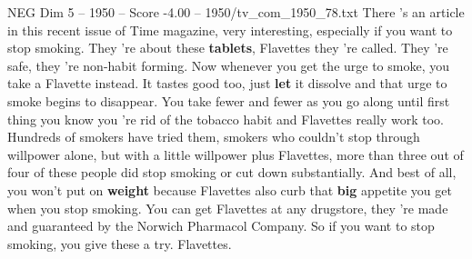 \begin{textsample}{NEG Dim 5 – 1950 – Score -4.00 – 1950/tv\_com\_1950\_78.txt}  \label{ex:f5_neg_046}
There 's an article in this recent issue of Time magazine, very interesting, especially if you want to stop smoking.
They 're about these \textbf{tablets}, Flavettes they 're called.
They 're safe, they 're non-habit forming.
Now whenever you get the urge to smoke, you take a Flavette instead.
It tastes good too, just \textbf{let} it dissolve and that urge to smoke begins to disappear.
You take fewer and fewer as you go along until first thing you know you 're rid of the tobacco habit and Flavettes really work too.
Hundreds of smokers have tried them, smokers who couldn't stop through willpower alone, but with a little willpower plus Flavettes, more than three out of four of these people did stop smoking or cut down substantially.
And best of all, you won't put on \textbf{weight} because Flavettes also curb that \textbf{big} appetite you get when you stop smoking.
You can get Flavettes at any drugstore, they 're made and guaranteed by the Norwich Pharmacol Company.
So if you want to stop smoking, you give these a try.
Flavettes.

\end{textsample}
